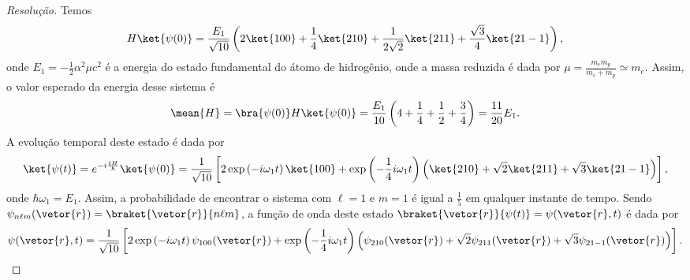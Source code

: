 \begin{proof}[Resolução]
    Temos
    \begin{equation*}
        H\ket{\psi(0)} = \frac{E_1}{\sqrt{10}} \left(2\ket{100} + \frac14 \ket{210} + \frac{1}{2\sqrt{2}}\ket{211} + \frac{\sqrt{3}}{4}\ket{21-1}\right),
    \end{equation*}
    onde \(E_1 = - \frac12 \alpha^2 \mu c^2\) é a energia do estado fundamental do átomo de hidrogênio, onde a massa reduzida é dada por \(\mu = \frac{m_e m_p}{m_e + m_p} \simeq m_e\). Assim, o valor esperado da energia desse sistema é
    \begin{equation*}
        \mean{H} = \bra{\psi(0)}H\ket{\psi(0)} = \frac{E_1}{10}\left(4 + \frac14 + \frac12 + \frac34\right) = \frac{11}{20}E_1.
    \end{equation*}
    A evolução temporal deste estado é dada por
    \begin{equation*}
        \ket{\psi(t)} = e^{-i\frac{tH}{\hbar}} \ket{\psi(0)} = \frac{1}{\sqrt{10}} \left[2 \exp\left(-i\omega_1 t\right)\ket{100} + \exp\left(-\frac14i\omega_1 t\right)\left(\ket{210} + \sqrt{2} \ket{211} + \sqrt{3}\ket{21-1}\right)\right],
    \end{equation*}
    onde \(\hbar \omega_1 = E_1\). Assim, a probabilidade de encontrar o sistema com \(\ell = 1\) e \(m = 1\) é igual a \(\frac15\) em qualquer instante de tempo. Sendo \(\psi_{n\ell m}(\vetor{r}) = \braket{\vetor{r}}{n \ell m}\), a função de onda deste estado \(\braket{\vetor{r}}{\psi(t)} = \psi(\vetor{r},t)\) é dada por
    \begin{equation*}
        \psi(\vetor{r},t) = \frac{1}{\sqrt{10}} \left[2 \exp\left(-i\omega_1 t\right)\psi_{100}(\vetor{r}) + \exp\left(-\frac14i\omega_1 t\right)\left(\psi_{210}(\vetor{r}) + \sqrt{2} \psi_{211}(\vetor{r}) + \sqrt{3}\psi_{21-1}(\vetor{r})\right)\right].
    \end{equation*}


\end{proof}
